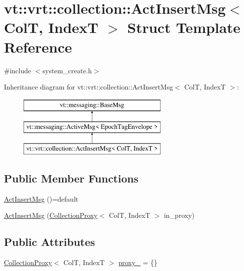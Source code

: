 \hypertarget{structvt_1_1vrt_1_1collection_1_1_act_insert_msg}{}\section{vt\+:\+:vrt\+:\+:collection\+:\+:Act\+Insert\+Msg$<$ ColT, IndexT $>$ Struct Template Reference}
\label{structvt_1_1vrt_1_1collection_1_1_act_insert_msg}


{\ttfamily \#include $<$system\+\_\+create.\+h$>$}

Inheritance diagram for vt\+:\+:vrt\+:\+:collection\+:\+:Act\+Insert\+Msg$<$ ColT, IndexT $>$\+:\begin{figure}[H]
\begin{center}
\leavevmode
\includegraphics[height=3.000000cm]{structvt_1_1vrt_1_1collection_1_1_act_insert_msg}
\end{center}
\end{figure}
\subsection*{Public Member Functions}
\begin{DoxyCompactItemize}
\item 
\hyperlink{structvt_1_1vrt_1_1collection_1_1_act_insert_msg_acd0c4f8868194e27580d9bf5d748bb14}{Act\+Insert\+Msg} ()=default
\item 
\hyperlink{structvt_1_1vrt_1_1collection_1_1_act_insert_msg_a26f5c8527a3fd30ece4ef661ebb41798}{Act\+Insert\+Msg} (\hyperlink{structvt_1_1vrt_1_1collection_1_1_collection_proxy}{Collection\+Proxy}$<$ ColT, IndexT $>$ in\+\_\+proxy)
\end{DoxyCompactItemize}
\subsection*{Public Attributes}
\begin{DoxyCompactItemize}
\item 
\hyperlink{structvt_1_1vrt_1_1collection_1_1_collection_proxy}{Collection\+Proxy}$<$ ColT, IndexT $>$ \hyperlink{structvt_1_1vrt_1_1collection_1_1_act_insert_msg_a2be9c49b1ec5c2706be27f75d8b3a168}{proxy\+\_\+} = \{\}
\end{DoxyCompactItemize}
